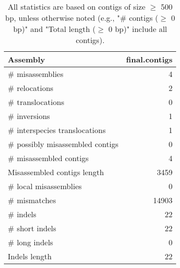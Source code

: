 \documentclass[12pt,a4paper]{article}
\begin{document}
\begin{table}[ht]
\begin{center}
\caption{All statistics are based on contigs of size $\geq$ 500 bp, unless otherwise noted (e.g., "\# contigs ($\geq$ 0 bp)" and "Total length ($\geq$ 0 bp)" include all contigs).}
\begin{tabular}{|l*{1}{|r}|}
\hline
Assembly & final.contigs \\ \hline
\# misassemblies & 4 \\ \hline
\hspace{5mm}\# relocations & 2 \\ \hline
\hspace{5mm}\# translocations & 0 \\ \hline
\hspace{5mm}\# inversions & 1 \\ \hline
\hspace{5mm}\# interspecies translocations & 1 \\ \hline
\# possibly misassembled contigs & 0 \\ \hline
\# misassembled contigs & 4 \\ \hline
Misassembled contigs length & 3459 \\ \hline
\# local misassemblies & 0 \\ \hline
\# mismatches & 14903 \\ \hline
\# indels & 22 \\ \hline
\hspace{5mm}\# short indels & 22 \\ \hline
\hspace{5mm}\# long indels & 0 \\ \hline
Indels length & 22 \\ \hline
\end{tabular}
\end{center}
\end{table}
\end{document}
